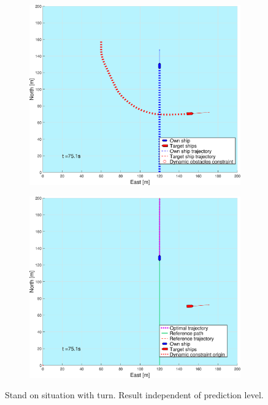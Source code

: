 \begin{figure}[ht!]
\begin{subfigure}[b]{0.494\textwidth}
        \subcaption{}
    \end{subfigure}
    \hfill
    \\
    \begin{subfigure}[b]{0.494\textwidth}
        \centering
        \includegraphics[width=\textwidth]{Images/Figures/sving_SO/_Simple_0fig1_time=75}
        \subcaption{}
    \end{subfigure}
    \hfill
    \begin{subfigure}[b]{0.494\textwidth}
        \centering
        \includegraphics[width=\textwidth]{Images/Figures/sving_SO/_Simple_0fig999_time=75}
        \subcaption{}
    \end{subfigure}
    \hfill
    \caption{Stand on situation with turn. Result independent of prediction level.}
    \label{FIG: turn SO}
\end{figure}%
